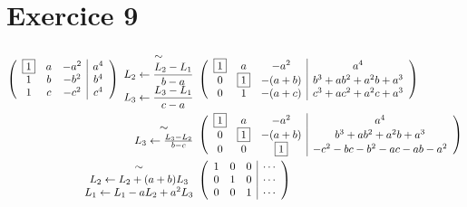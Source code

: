 \part{Exercice 9}

\newenvironment{amat}{\left(\begin{array}{c c c|c}}{\end{array}\right)}
\newcommand{\bx}[1]{\fbox{$#1$}}

\begin{align*}
	\begin{amat}
		\bx 1 & a & -a^2 & a^4\\
		1 & b & -b^2 & b^4\\
		1 & c & -c^2 & c^4
	\end{amat}
	\begin{array}{c}
		\sim\\
		\scriptstyle L_2 \leftarrow \frac{L_2 - L_1}{b-a}\\
		\scriptstyle L_3 \leftarrow \frac{L_3 - L_1}{c-a}
	\end{array}&
	\begin{amat}
		\bx 1 & a & -a^2 & a^4\\
		0 & \bx 1 & -(a+b) & b^3 + ab^2 + a^2b+a^3\\
		0 & 1 & -(a+c) & c^3 + ac^2 + a^2c + a^3
	\end{amat}\\
	\begin{array}{c}
		\sim\\
		L_3 \leftarrow \frac{L_3 - L_2}{b-c}\\
	\end{array}&
	\begin{amat}
		\bx 1 & a & -a^2 & a^4\\
		0 & \bx 1 & -(a+b) & b^3 + ab^2 + a^2b + a^3\\
		0 & 0 & \bx 1 & -c^2 - bc - b^2 - ac -ab -a^2
	\end{amat}\\
	\begin{array}{c}
		\sim\\
		L_2\leftarrow L_2+(a+b)L_3\\
		L_1\leftarrow L_1-aL_2+a^2L_3
	\end{array}&
	\begin{amat}
		1&0&0&\cdots\\
		0&1&0&\cdots\\
		0&0&1&\cdots
	\end{amat}
\end{align*}
